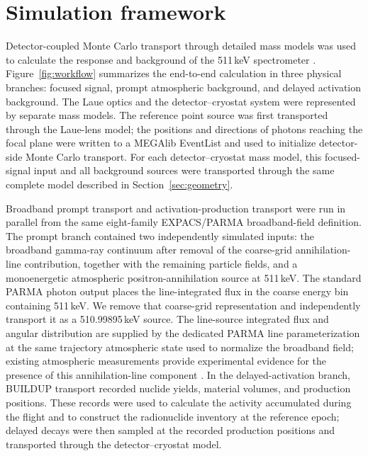 \documentclass[11pt]{article}
\begin{document}
\FloatBarrier

\section{Simulation framework}
\label{sec:framework}

Detector-coupled Monte Carlo transport through detailed mass models was used to calculate the response and background of the 511\,keV spectrometer \cite{Sturner2003}. Figure~\ref{fig:workflow} summarizes the end-to-end calculation in three physical branches: focused signal, prompt atmospheric background, and delayed activation background. The Laue optics and the detector--cryostat system were represented by separate mass models. The reference point source was first transported through the Laue-lens model; the positions and directions of photons reaching the focal plane were written to a MEGAlib EventList and used to initialize detector-side Monte Carlo transport. For each detector--cryostat mass model, this focused-signal input and all background sources were transported through the same complete model described in Section~\ref{sec:geometry}.

Broadband prompt transport and activation-production transport were run in parallel from the same eight-family EXPACS/PARMA broadband-field definition. The prompt branch contained two independently simulated inputs: the broadband gamma-ray continuum after removal of the coarse-grid annihilation-line contribution, together with the remaining particle fields, and a monoenergetic atmospheric positron-annihilation source at 511\,keV. The standard PARMA photon output places the line-integrated flux in the coarse energy bin containing 511\,keV. We remove that coarse-grid representation and independently transport it as a 510.99895\,keV source. The line-source integrated flux and angular distribution are supplied by the dedicated PARMA line parameterization at the same trajectory atmospheric state used to normalize the broadband field; existing atmospheric measurements provide experimental evidence for the presence of this annihilation-line component \cite{Mahoney1981Atmospheric,Harris2003Atmospheric}. In the delayed-activation branch, BUILDUP transport recorded nuclide yields, material volumes, and production positions. These records were used to calculate the activity accumulated during the flight and to construct the radionuclide inventory at the reference epoch; delayed decays were then sampled at the recorded production positions and transported through the detector--cryostat model.
\end{document}
